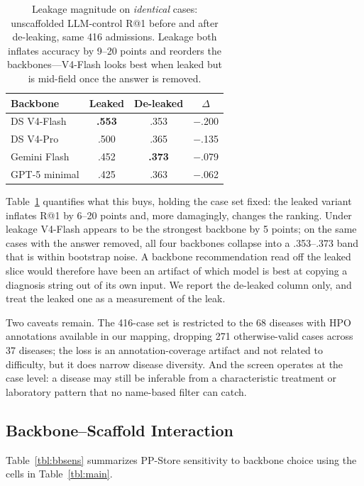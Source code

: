 \documentclass[letterpaper]{article} %
\begin{document}
\begin{table}[t]
\centering
\small
\setlength{\tabcolsep}{5pt}
\caption{Leakage magnitude on \emph{identical} cases: unscaffolded LLM-control R@1 before and after de-leaking, same 416 admissions. Leakage both inflates accuracy by 9--20 points and reorders the backbones---V4-Flash looks best when leaked but is mid-field once the answer is removed.}
\label{tbl:deleak}
\begin{tabular}{@{}lccc@{}}
\toprule
Backbone & Leaked & De-leaked & $\Delta$ \\
\midrule
DS V4-Flash & \textbf{.553} & .353 & $-$.200 \\
DS V4-Pro & .500 & .365 & $-$.135 \\
Gemini Flash & .452 & \textbf{.373} & $-$.079 \\
GPT-5 minimal & .425 & .363 & $-$.062 \\
\bottomrule
\end{tabular}
\end{table}

Table~\ref{tbl:deleak} quantifies what this buys, holding the case set fixed:
the leaked variant inflates R@1 by 6--20 points and, more damagingly, changes the
ranking. Under leakage V4-Flash appears to be the strongest backbone by 5 points;
on the same cases with the answer removed, all four backbones collapse into a
.353--.373 band that is within bootstrap noise. A backbone recommendation read
off the leaked slice would therefore have been an artifact of which model is best
at copying a diagnosis string out of its own input. We report the de-leaked
column only, and treat the leaked one as a measurement of the leak.

Two caveats remain. The 416-case set is restricted to the 68 diseases with HPO
annotations available in our mapping, dropping 271 otherwise-valid cases across
37 diseases; the loss is an annotation-coverage artifact and not related to
difficulty, but it does narrow disease diversity. And the screen operates at the
case level: a disease may still be inferable from a characteristic treatment or
laboratory pattern that no name-based filter can catch.

\subsection{Backbone--Scaffold Interaction}
\label{sec-6-2}

Table~\ref{tbl:bbsens} summarizes PP-Store sensitivity to backbone choice using the cells in Table~\ref{tbl:main}.
\end{document}
